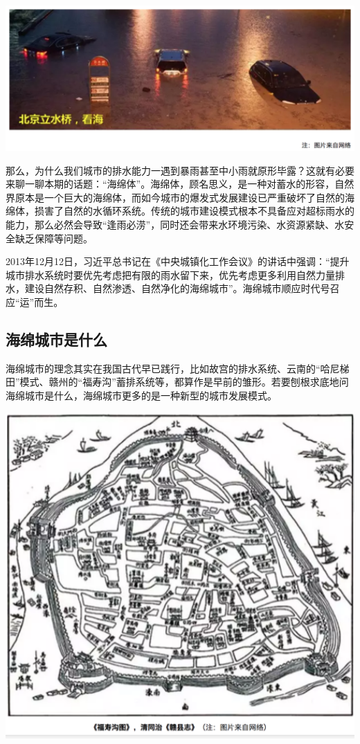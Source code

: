 \documentclass[]{book}
\begin{document}
\includegraphics[width=6.67in]{images/ch1}

那么，为什么我们城市的排水能力一遇到暴雨甚至中小雨就原形毕露？这就有必要来聊一聊本期的话题：``海绵体''。海绵体，顾名思义，是一种对蓄水的形容，自然界原本是一个巨大的海绵体，而如今城市的爆发式发展建设已严重破坏了自然的海绵体，损害了自然的水循环系统。传统的城市建设模式根本不具备应对超标雨水的能力，那么必然会导致``逢雨必涝''，同时还会带来水环境污染、水资源紧缺、水安全缺乏保障等问题。

2013年12月12日，习近平总书记在《中央城镇化工作会议》的讲话中强调：``提升城市排水系统时要优先考虑把有限的雨水留下来，优先考虑更多利用自然力量排水，建设自然存积、自然渗透、自然净化的海绵城市''。海绵城市顺应时代号召应``运''而生。

\subsection{海绵城市是什么}

海绵城市的理念其实在我国古代早已践行，比如故宫的排水系统、云南的``哈尼梯田''模式、赣州的``福寿沟''蓄排系统等，都算作是早前的雏形。若要刨根求底地问海绵城市是什么，海绵城市更多的是一种新型的城市发展模式。

\includegraphics[width=6.67in]{images/ch2}
\end{document}
